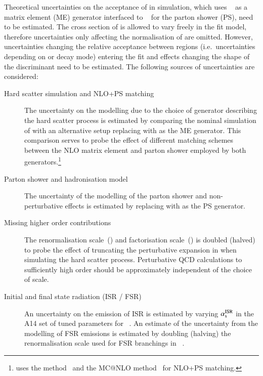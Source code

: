 Theoretical uncertainties on the acceptance of \ttbar in simulation, which uses
\POWHEGBOX[v2]~\cite{Frixione:2007nw} as a matrix element (ME) generator
interfaced to \PYTHIA[8.230]~\cite{Sjostrand:2014zea} for the parton shower
(PS), need to be estimated. The cross section of \ttbar is allowed to vary
freely in the fit model, therefore uncertainties only affecting the
normalisation of \ttbar are omitted. However, uncertainties changing the
relative acceptance between regions (i.e.\ uncertainties depending on \tauhadvis
\pT or decay mode) entering the fit and effects changing the shape of the \mTW
discriminant need to be estimated. The following sources of uncertainties are
considered:
\begin{description}

\item[Hard scatter simulation and NLO+PS matching] The uncertainty on the
  modelling due to the choice of generator describing the hard scatter process
  is estimated by comparing the nominal simulation of \ttbar with an alternative
  setup replacing \POWHEGBOX[v2] with \MGNLO as the ME generator. This
  comparison serves to probe the effect of different matching schemes between
  the NLO matrix element and parton shower employed by both
  generators.\footnote{\POWHEGBOX[v2] uses the \POWHEG
    method~\cite{Nason:2004rx,Frixione:2007vw,Alioli:2010xd} and \MGNLO the
    MC@NLO method~\cite{Frixione:2002ik} for NLO+PS matching.}

\item[Parton shower and hadronisation model] The uncertainty of the modelling of
  the parton shower and non-perturbative effects is estimated by replacing
  \PYTHIA[8] with \HERWIG[7.0.4] as the PS generator.

\item[Missing higher order contributions] The renormalisation scale~(\muR) and
  factorisation scale~(\muF) is doubled (halved) to probe the effect of
  truncating the perturbative expansion in \alphas when simulating the hard
  scatter process. Perturbative QCD calculations to sufficiently high order
  should be approximately independent of the choice of scale.

\item[Initial and final state radiation (ISR / FSR)] An uncertainty on the
  emission of ISR is estimated by varying $\alpha_{\text{s}}^\text{ISR}$ in the A14 set of
  tuned parameters for \PYTHIA[8]~\cite{ATL-PHYS-PUB-2014-021}.
  An estimate of the uncertainty from the modelling of FSR emissions is
  estimated by doubling (halving) the renormalisation scale used for FSR
  branchings in
  \PYTHIA[8]~\cite{Sjostrand:2014zea,Mrenna:2016sih,pythia-variations-online}.


\end{description}
